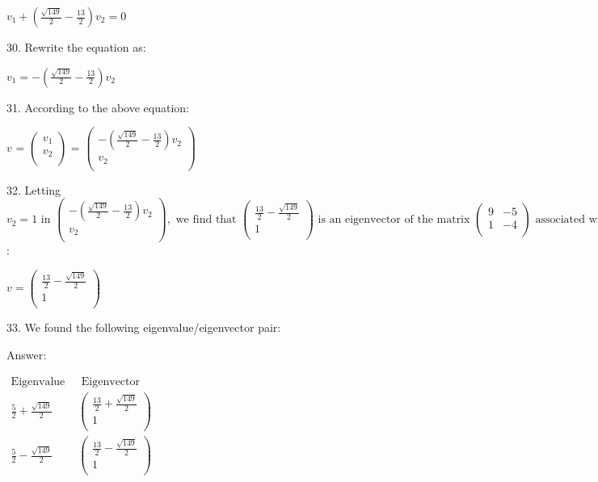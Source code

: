 \documentclass{article}
\begin{document}
$v_1+\left(\frac{\sqrt{149}}{2}-\frac{13}{2}\right) v_2=0$

30. Rewrite the equation as:

$v_1=-\left(\frac{\sqrt{149}}{2}-\frac{13}{2}\right) v_2$

31. According to the above equation:

$v\text{ = }\left(
\begin{array}{c}
v_1 \\
 v_2 \\
\end{array}
\right)\text{ = }\left(
\begin{array}{c}
-\left(\frac{\sqrt{149}}{2}-\frac{13}{2}\right) v_2 \\
 v_2 \\
\end{array}
\right)$

32. Letting $v_2=1\text{ in }\left(
\begin{array}{c}
-\left(\frac{\sqrt{149}}{2}-\frac{13}{2}\right) v_2 \\
 v_2 \\
\end{array}
\right),\text{ we find that }\left(
\begin{array}{c}
\frac{13}{2}-\frac{\sqrt{149}}{2} \\
 1 \\
\end{array}
\right)\text{ is an eigenvector of the matrix }\left(
\begin{array}{cc}
9 & -5 \\
 1 & -4 \\
\end{array}
\right)\text{ associated with the eigenvalue }\frac{5}{2}-\frac{\sqrt{149}}{2}$:

$v=\left(
\begin{array}{c}
\frac{13}{2}-\frac{\sqrt{149}}{2} \\
 1 \\
\end{array}
\right)$

33. We found the following eigenvalue/eigenvector pair:

Answer:

$\begin{array}{c|c}
\text{Eigenvalue }&\text{ Eigenvector }\\
\hline
 \frac{5}{2}+\frac{\sqrt{149}}{2} & \left(
\begin{array}{c}
\frac{13}{2}+\frac{\sqrt{149}}{2} \\
 1 \\
\end{array}
\right) \\
 \frac{5}{2}-\frac{\sqrt{149}}{2} & \left(
\begin{array}{c}
\frac{13}{2}-\frac{\sqrt{149}}{2} \\
 1 \\
\end{array}
\right) \\
\end{array}$
\end{document}

